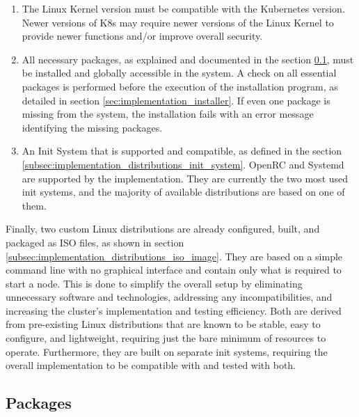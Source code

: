 \begin{enumerate}
  \item The Linux Kernel version must be compatible with the Kubernetes version.
    \newline
    Newer versions of K8s may require newer versions of the Linux Kernel to
    provide newer functions and/or improve overall security.

  \item All necessary packages, as explained and documented in the section
    \ref{subsec:implementation_distributions_packages}, must be installed and globally
    accessible in the system.
    \newline
    A check on all essential packages is performed before the execution of the
    installation program, as detailed in section \ref{sec:implementation_installer}.
    If even one package is missing from the system, the installation fails with an
    error message identifying the missing packages.

  \item An Init System that is supported and compatible, as defined in the
    section \ref{subsec:implementation_distributions_init_system}.
    \newline
    OpenRC and Systemd are supported by the implementation. They are currently
    the two most used init systems, and the majority of available distributions are
    based on one of them.
\end{enumerate}
Finally, two custom Linux distributions are already configured, built, and
packaged as ISO files, as shown in section \ref{subsec:implementation_distributions_iso_image}.
They are based on a simple command line with no graphical interface and contain
only what is required to start a node. This is done to simplify the overall setup
by eliminating unnecessary software and technologies, addressing any
incompatibilities, and increasing the cluster's implementation and testing efficiency.
Both are derived from pre-existing Linux distributions that are known to be
stable, easy to configure, and lightweight, requiring just the bare minimum of resources
to operate. Furthermore, they are built on separate init systems, requiring the
overall implementation to be compatible with and tested with both.

\subsection{Packages}
\label{subsec:implementation_distributions_packages}


